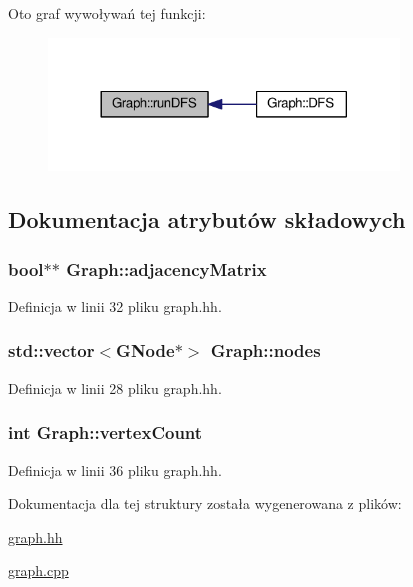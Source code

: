 Oto graf wywoływań tej funkcji\-:\nopagebreak
\begin{figure}[H]
\begin{center}
\leavevmode
\includegraphics[width=264pt]{struct_graph_a134ba75705fd92115b1c612b2681f6ea_icgraph}
\end{center}
\end{figure}




\subsection{Dokumentacja atrybutów składowych}
\hypertarget{struct_graph_a567f812ec20174e2642722ff8bd63b07}{
\subsubsection[{adjacency\-Matrix}]{\setlength{\rightskip}{0pt plus 5cm}bool$\ast$$\ast$ Graph\-::adjacency\-Matrix\hspace{0.3cm}{\ttfamily [private]}}}\label{struct_graph_a567f812ec20174e2642722ff8bd63b07}


Definicja w linii 32 pliku graph.\-hh.

\hypertarget{struct_graph_a5850883f2e0f8624184f1918e16ccb7b}{
\subsubsection[{nodes}]{\setlength{\rightskip}{0pt plus 5cm}std\-::vector$<${\bf G\-Node}$\ast$$>$ Graph\-::nodes\hspace{0.3cm}{\ttfamily [private]}}}\label{struct_graph_a5850883f2e0f8624184f1918e16ccb7b}


Definicja w linii 28 pliku graph.\-hh.

\hypertarget{struct_graph_aa61a470b538b8c5836ae3f3e6a4dc438}{
\subsubsection[{vertex\-Count}]{\setlength{\rightskip}{0pt plus 5cm}int Graph\-::vertex\-Count\hspace{0.3cm}{\ttfamily [private]}}}\label{struct_graph_aa61a470b538b8c5836ae3f3e6a4dc438}


Definicja w linii 36 pliku graph.\-hh.



Dokumentacja dla tej struktury została wygenerowana z plików\-:\begin{DoxyCompactItemize}
\item 
\hyperlink{graph_8hh}{graph.\-hh}\item 
\hyperlink{graph_8cpp}{graph.\-cpp}\end{DoxyCompactItemize}
